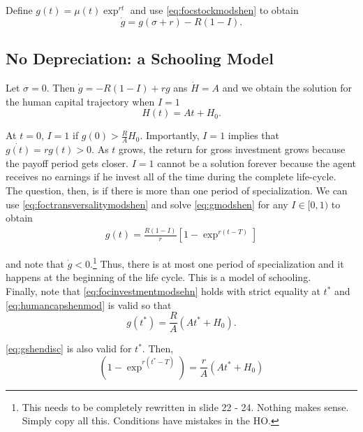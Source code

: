 \indent Define $g(t) = \mu(t) \exp^{rt}$ and use \eqref{eq:focstockmodshen} to obtain
\begin{equation}
\dot{g} = g(\sigma + r) - R(1 - I). \label{eq:gmodshen}
\end{equation}

\subsection{No Depreciation: a Schooling Model}
Let $\sigma = 0 $. Then $\dot{g} = -R(1 - I) + rg$ ans $\dot{H} = A$ and we obtain the solution for the human capital trajectory when $I = 1$
\begin{equation}
H(t) = At + H_{0} \label{eq:humancapshenmod}.
\end{equation} 

\noindent At $t = 0$, $I = 1$ if $g(0) > \frac{R}{A} H_{0}$. Importantly, $I = 1$ implies that $\dot{g(t)} = r g(t) > 0$. As $t$ grows, the return for gross investment grows because the payoff period gets closer. $I = 1$ cannot be a solution forever because the agent receives no earnings if he invest all of the time during the complete life-cycle.\\
\indent The question, then, is if there is more than one period of specialization. We can use \eqref{eq:foctransversalitymodshen} and solve \eqref{eq:gmodshen} for any $I \in [0,1)$ to obtain
\begin{eqnarray}
g(t) = \frac{R(1-I)}{r} \left[ 1 - \exp^{r(t - T)} \right] \label{eq:gshendisc}
\end{eqnarray}

\noindent and note that $\dot{g} < 0$.\footnote{This needs to be completely rewritten in slide 22 - 24. Nothing makes sense. Simply copy all this. Conditions have mistakes in the HO.} Thus, there is at most one period of specialization and it happens at the beginning of the life cycle. This is a model of schooling.\\
\indent Finally, note that \eqref{eq:focinvestmentmodsehn} holds with strict equality at $t^*$ and \eqref{eq:humancapshenmod} is valid so that
\begin{equation}
g(t^*) = \frac{R}{A} \left( A t^* + H_{0} \right). 
\end{equation}

\noindent \eqref{eq:gshendisc} is also valid for $t^*$. Then,
\begin{equation}
\left( 1 - \exp^{r(t^*-T)} \right) = \frac{r}{A} \left( A t^* + H_{0} \right)
\end{equation}

